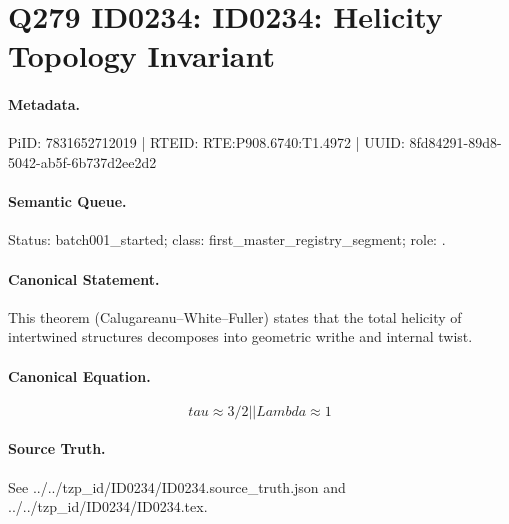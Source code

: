 \section*{Q279 ID0234: ID0234: Helicity Topology Invariant}
\paragraph{Metadata.}
PiID: 7831652712019 | RTEID: RTE:P908.6740:T1.4972 | UUID: 8fd84291-89d8-5042-ab5f-6b737d2ee2d2

\paragraph{Semantic Queue.}
Status: batch001\_started; class: first\_master\_registry\_segment; role: .

\paragraph{Canonical Statement.}
This theorem (Calugareanu--White--Fuller) states that the total helicity of intertwined structures decomposes into geometric writhe and internal twist.

\paragraph{Canonical Equation.}
\[
tau \approx 3/2 || Lambda \approx 1
\]

\paragraph{Source Truth.}
See ../../tzp\_id/ID0234/ID0234.source\_truth.json and ../../tzp\_id/ID0234/ID0234.tex.

